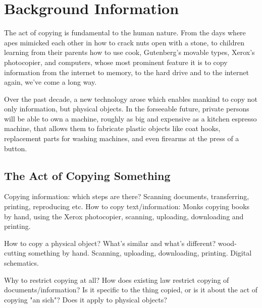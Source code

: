 \section{Background Information}

The act of copying is fundamental to the human nature.  From the days where apes
mimicked each other in how to crack nuts open with a stone, to children learning
from their parents how to use cook, Gutenberg's movable types, Xerox's
photocopier, and computers, whose most prominent feature it is to copy
information from the internet to memory, to the hard drive and to the internet
again, we've come a long way.

Over the past decade, a new technology arose which enables mankind to copy not
only information, but physical objects.  In the forseeable future, private
persons will be able to own a machine, roughly as big and expensive as a
kitchen espresso machine, that allows them to fabricate plastic objects like
coat hooks, replacement parts for washing machines, and even firearms at the
press of a button.

\subsection{The Act of Copying Something}

Copying information: which steps are there?  Scanning documents, transferring,
printing, reproducing etc.  How to copy text/information: Monks copying books
by hand, using the Xerox photocopier, scanning, uploading, downloading and
printing.

How to copy a physical object?  What's similar and what's different?
wood-cutting something by hand.  Scanning, uploading, downloading, printing.
Digital schematics.

Why to restrict copying at all?  How does existing law restrict copying of
documents/information?  Is it specific to the thing copied, or is it about the
act of copying "an sich"?  Does it apply to physical objects?
